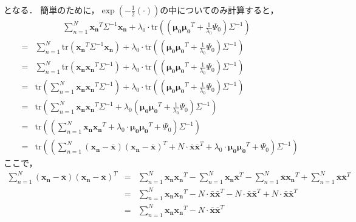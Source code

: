 \documentclass[a4j]{jarticle}
\begin{document}
となる．
簡単のために，$\exp{(-\frac{1}{2}(\cdot))}$の中についてのみ計算すると，
\begin{eqnarray}
\sum_{n=1}^{N}{\boldsymbol{x_n}^T \Sigma^{-1} \boldsymbol{x_n}} + \lambda_0 \cdot \textrm{tr}\left(\left( \boldsymbol{\mu_0} \boldsymbol{\mu_0}^T + \frac{1}{\lambda_0} \Psi_0 \right) \Sigma^{-1} \right)
\end{eqnarray}
\begin{eqnarray}
&=&
\sum_{n=1}^{N}{\textrm{tr}\left( \boldsymbol{x_n}^T \Sigma^{-1} \boldsymbol{x_n} \right)} + \lambda_0 \cdot \textrm{tr}\left(\left( \boldsymbol{\mu_0} \boldsymbol{\mu_0}^T + \frac{1}{\lambda_0} \Psi_0 \right) \Sigma^{-1} \right) \\
&=&
\sum_{n=1}^{N}{\textrm{tr}\left( \boldsymbol{x_n} \boldsymbol{x_n}^T \Sigma^{-1} \right)} + \lambda_0 \cdot \textrm{tr}\left(\left( \boldsymbol{\mu_0} \boldsymbol{\mu_0}^T + \frac{1}{\lambda_0} \Psi_0 \right) \Sigma^{-1} \right) \\
&=&
\textrm{tr}\left( \sum_{n=1}^{N}{\boldsymbol{x_n} \boldsymbol{x_n}^T \Sigma^{-1}} \right) + \lambda_0 \cdot \textrm{tr}\left(\left( \boldsymbol{\mu_0} \boldsymbol{\mu_0}^T + \frac{1}{\lambda_0} \Psi_0 \right) \Sigma^{-1} \right) \\
&=&
\textrm{tr}\left( \sum_{n=1}^{N}{\boldsymbol{x_n} \boldsymbol{x_n}^T \Sigma^{-1}} + \lambda_0 \left( \boldsymbol{\mu_0} \boldsymbol{\mu_0}^T + \frac{1}{\lambda_0} \Psi_0 \right) \Sigma^{-1} \right) \\
&=&
\textrm{tr}\left( \left( \sum_{n=1}^{N}{\boldsymbol{x_n} \boldsymbol{x_n}^T} + \lambda_0 \cdot \boldsymbol{\mu_0} \boldsymbol{\mu_0}^T + \Psi_0 \right) \Sigma^{-1} \right) \\
&=&
\textrm{tr}\left( \left( \sum_{n=1}^{N}{(\boldsymbol{x_n} - \boldsymbol{\bar{x}}) (\boldsymbol{x_n} - \boldsymbol{\bar{x}})^T}  + N \cdot \boldsymbol{\bar{x}} \boldsymbol{\bar{x}}^T + \lambda_0 \cdot \boldsymbol{\mu_0} \boldsymbol{\mu_0}^T + \Psi_0 \right) \Sigma^{-1} \right) \label{calc:NIW_post_Psi}
\end{eqnarray}
ここで，
\begin{eqnarray}
\sum_{n=1}^{N}{\left(\boldsymbol{x_n} - \boldsymbol{\bar{x}}\right)\left(\boldsymbol{x_n} - \boldsymbol{\bar{x}}\right)^T}
&=&
\sum_{n=1}^{N}{\boldsymbol{x_n} \boldsymbol{x_n}^T} - \sum_{n=1}^{N}{\boldsymbol{x_n} \boldsymbol{\bar{x}}^T} - \sum_{n=1}^{N}{\boldsymbol{\bar{x}} \boldsymbol{x_n}^T} + \sum_{n=1}^{N}{\boldsymbol{\bar{x}} \boldsymbol{\bar{x}}^T}\\
&=& \sum_{n=1}^{N}{\boldsymbol{x_n} \boldsymbol{x_n}^T} - N \cdot \boldsymbol{\bar{x}} \boldsymbol{\bar{x}}^T - N \cdot \boldsymbol{\bar{x}} \boldsymbol{\bar{x}}^T + N \cdot \boldsymbol{\bar{x}} \boldsymbol{\bar{x}}^T\\
&=&
\sum_{n=1}^{N}{\boldsymbol{x_n} \boldsymbol{x_n}^T} - N \cdot \boldsymbol{\bar{x}} \boldsymbol{\bar{x}}^T
\end{eqnarray}
\end{document}

